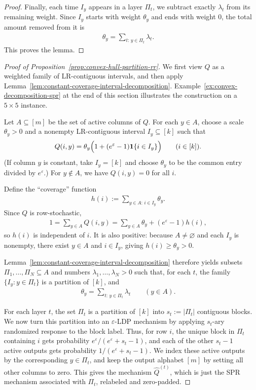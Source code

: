 \documentclass{article}
\theoremstyle{plain}
\theoremstyle{definition}
\theoremstyle{plain}
\newcommand{\eps}{\varepsilon}
\begin{document}
\begin{proof}
Finally, each time $I_y$ appears in a layer $\Pi_t$, we subtract exactly $\lambda_t$ from its remaining weight. Since $I_y$ starts with weight $\theta_y$ and ends with weight $0$, the total amount removed from it is
\begin{align*}
    \theta_y=\sum_{t:\, y\in \Pi_t}\lambda_t.
\end{align*}
This proves the lemma.
\end{proof}

\begin{proof}[Proof of Proposition~\ref{prop:convex-hull-partition-rr}]
We first view $Q$ as a weighted family of LR-contiguous intervals, and then apply Lemma~\ref{lem:constant-coverage-interval-decomposition}. Example~\ref{ex:convex-decomposition-spr} at the end of this section illustrates the construction on a $5\times 5$ instance.

Let $A\subseteq[m]$ be the set of active columns of $Q$. For each $y\in A$, choose a scale $\theta_y>0$ and a nonempty LR-contiguous interval $I_y\subseteq [k]$ such that
\begin{align*}
    Q(i,y)=\theta_y\Bigl(1+(e^\eps-1)\mathbf 1\{i\in I_y\}\Bigr)
    \qquad (i\in [k]).
\end{align*}
(If column $y$ is constant, take $I_y=[k]$ and choose $\theta_y$ to be the common entry divided by $e^\eps$.) For $y\notin A$, we have $Q(i,y)=0$ for all $i$.

Define the ``coverage'' function
\begin{align*}
    h(i):=\sum_{y\in A:\, i\in I_y}\theta_y.
\end{align*}
Since $Q$ is row-stochastic,
\begin{align*}
    1=\sum_{y\in A}Q(i,y)
    =\sum_{y\in A}\theta_y+(e^\eps-1)h(i),
\end{align*}
so $h(i)$ is independent of $i$. It is also positive: because $A\neq\varnothing$ and each $I_y$ is nonempty, there exist $y\in A$ and $i\in I_y$, giving $h(i)\ge \theta_y>0$.

Lemma~\ref{lem:constant-coverage-interval-decomposition} therefore yields subsets $\Pi_1,\dots,\Pi_N\subseteq A$ and numbers $\lambda_1,\dots,\lambda_N>0$ such that, for each $t$, the family $\{I_y:y\in \Pi_t\}$ is a partition of $[k]$, and
\begin{align*}
    \theta_y=\sum_{t:\, y\in \Pi_t}\lambda_t \qquad (y\in A).
\end{align*}

For each layer $t$, the set $\Pi_t$ is a partition of $[k]$ into $s_t:=|\Pi_t|$ contiguous blocks. We now turn this partition into an $\eps$-LDP mechanism by applying $s_t$-ary randomized response to the block label. Thus, for row $i$, the unique block in $\Pi_t$ containing $i$ gets probability $e^\eps/(e^\eps+s_t-1)$, and each of the other $s_t-1$ active outputs gets probability $1/(e^\eps+s_t-1)$. We index these active outputs by the corresponding $y\in \Pi_t$, and keep the output alphabet $[m]$ by setting all other columns to zero. This gives the mechanism $\widehat Q^{(t)}$, which is just the SPR mechanism associated with $\Pi_t$, relabeled and zero-padded.


\end{proof}
\end{document}
